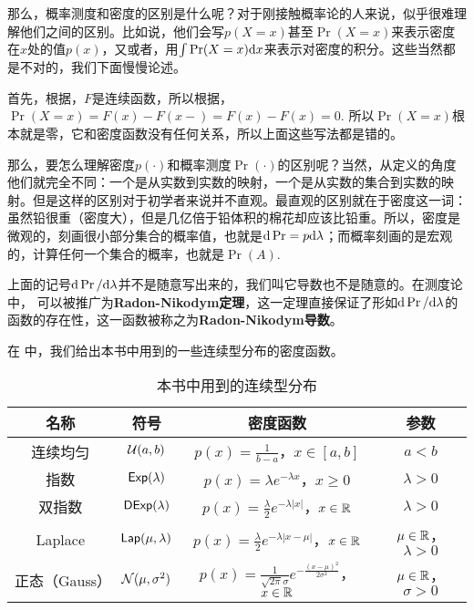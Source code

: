 那么，概率测度和密度的区别是什么呢？对于刚接触概率论的人来说，似乎很难理解他们之间的区别。比如说，他们会写$p(X=x)$甚至$\Pr(X=x)$来表示密度在$x$处的值$p(x)$，又或者，用$\int\Pr(X=x)\mathrm{d} x$来表示对密度的积分。这些当然都是不对的，我们下面慢慢论述。

首先，根据，$F$是连续函数，所以根据，$\Pr(X=x)=F(x)-F(x-)=F(x)-F(x)=0$. 所以$\Pr(X=x)$根本就是零，它和密度函数没有任何关系，所以上面这些写法都是错的。

那么，要怎么理解密度$p(\cdot)$和概率测度$\Pr(\cdot)$的区别呢？当然，从定义的角度他们就完全不同：一个是从实数到实数的映射，一个是从实数的集合到实数的映射。但是这样的区别对于初学者来说并不直观。最直观的区别就在于密度这一词：虽然铅很重（密度大），但是几亿倍于铅体积的棉花却应该比铅重。所以，密度是微观的，刻画很小部分集合的概率值，也就是$\mathrm{d}\Pr=p\mathrm{d} \lambda$；而概率刻画的是宏观的，计算任何一个集合的概率，也就是$\Pr(A)$.

\begin{remark}
    上面的记号$\mathrm{d}\Pr/\mathrm{d}\lambda$并不是随意写出来的，我们叫它导数也不是随意的。在测度论中， 可以被推广为\textbf{Radon-Nikodym定理}，这一定理直接保证了形如$\mathrm{d}\Pr/\mathrm{d}\lambda$的函数的存在性，这一函数被称之为\textbf{Radon-Nikodym导数}。
\end{remark}

在 中，我们给出本书中用到的一些连续型分布的密度函数。

\begin{table}[htbp]
\centering
\begin{tabular}{cccc}
\toprule
名称 & 符号 & 密度函数 & 参数 \\
\midrule
连续均匀 & $\mathcal{U}(a,b)$ &$p(x)=\frac{1}{b-a}$，$x\in[a,b]$ & $a<b$ \\
指数 & $\mathsf{Exp}(\lambda)$ & $p(x)=\lambda e^{-\lambda x}$，$x\geq 0$ & $\lambda>0$ \\
双指数 & $\mathsf{DExp}(\lambda)$ & $p(x)=\frac{\lambda}{2}e^{-\lambda|x|}$，$x\in\mathbb{R}$ & $\lambda>0$ \\
Laplace & $\mathsf{Lap}(\mu,\lambda)$ & $p(x)=\frac{\lambda}{2}e^{-\lambda|x-\mu|}$，$x\in\mathbb{R}$ & $\mu\in\mathbb{R}$，$\lambda>0$ \\
正态（Gauss） & $\mathcal{N}(\mu,\sigma^2)$ & $p(x)=\frac{1}{\sqrt{2\pi}\sigma}e^{-\frac{(x-\mu)^2}{2\sigma^2}}$，$x\in\mathbb{R}$ & $\mu\in\mathbb{R}$，$\sigma>0$ \\
\bottomrule
\end{tabular}
\caption{本书中用到的连续型分布}
\label{tab:continuous-distribution}
\end{table}

